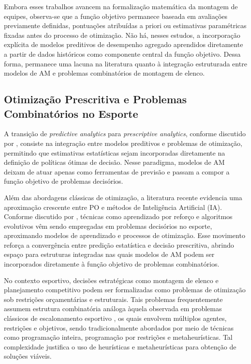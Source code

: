 Embora esses trabalhos avancem na formalização matemática da montagem de equipes, observa-se que a função objetivo permanece baseada em avaliações 
previamente definidas, pontuações atribuídas a priori ou estimativas paramétricas fixadas antes do processo de otimização. Não há, nesses estudos, 
a incorporação explícita de modelos preditivos de desempenho agregado aprendidos diretamente a partir de dados históricos como componente central 
da função objetivo. Dessa forma, permanece uma lacuna na literatura quanto à integração estruturada entre modelos de AM e problemas 
combinatórios de montagem de elenco.

\subsection{Otimização Prescritiva e Problemas Combinatórios no Esporte}

A transição de \textit{predictive analytics} para \textit{prescriptive analytics}, conforme discutido por \cite{Bertsimas2019}, 
consiste na integração entre modelos preditivos e problemas de otimização, permitindo que estimativas estatísticas sejam incorporadas 
diretamente na definição de políticas ótimas de decisão. Nesse paradigma, modelos de AM deixam de atuar apenas como ferramentas de previsão e 
passam a compor a função objetivo de problemas decisórios.

Além das abordagens clássicas de otimização, a literatura recente evidencia uma aproximação crescente entre PO e métodos de Inteligência Artificial (IA). 
Conforme discutido por \cite{Chmait2021}, técnicas como aprendizado por reforço e algoritmos evolutivos vêm sendo empregadas em problemas decisórios 
no esporte, aproximando modelos de aprendizado e processos de otimização. Esse movimento reforça a convergência entre predição estatística e decisão prescritiva, 
abrindo espaço para estruturas integradas nas quais modelos de AM podem ser incorporados diretamente à função objetivo de problemas combinatórios.

No contexto esportivo, decisões estratégicas como montagem de elenco e planejamento competitivo podem ser formalizadas como problemas de otimização 
sob restrições orçamentárias e estruturais. Tais problemas frequentemente assumem estrutura combinatória análoga àquela observada em problemas clássicos 
de escalonamento esportivo \cite{Kendall2010,Kendall2010b}, os quais envolvem múltiplos agentes, restrições e objetivos, sendo tradicionalmente abordados 
por meio de técnicas como programação inteira, programação por restrições e metaheurísticas. Tal complexidade justifica o uso de heurísticas e metaheurísticas 
para obtenção de soluções viáveis.

